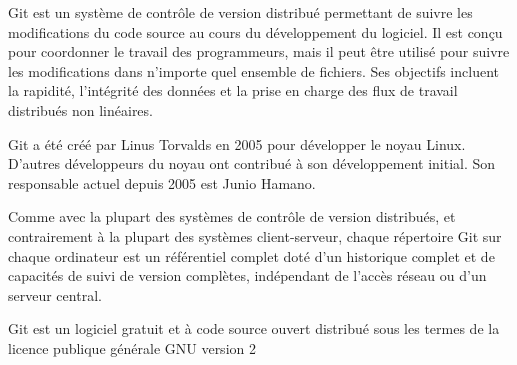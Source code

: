 Git est un système de contrôle de version distribué permettant de suivre les modifications du code source au cours du développement du logiciel. 
Il est conçu pour coordonner le travail des programmeurs, mais il peut être utilisé pour suivre les modifications dans n’importe quel ensemble de fichiers. Ses objectifs incluent la rapidité, l'intégrité des données et la prise en charge des flux de travail distribués non linéaires.

Git a été créé par Linus Torvalds en 2005 pour développer le noyau Linux. D'autres développeurs du noyau ont contribué à son développement initial. Son responsable actuel depuis 2005 est Junio Hamano.

Comme avec la plupart des systèmes de contrôle de version distribués, et contrairement à la plupart des systèmes client-serveur, chaque répertoire Git sur chaque ordinateur est un référentiel complet doté d'un historique complet et de capacités de suivi de version complètes, indépendant de l'accès réseau ou d'un serveur central.

Git est un logiciel gratuit et à code source ouvert distribué sous les termes de la licence publique générale GNU version 2 \cite{noauthor_git_nodate}